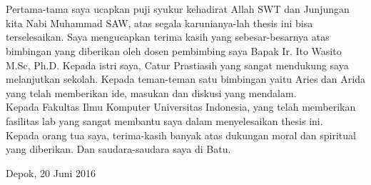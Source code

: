 \chapter*{\kataPengantar}
Pertama-tama saya ucapkan puji syukur kehadirat Allah SWT dan Junjungan kita Nabi Muhammad SAW, atas segala karunianya-lah thesis ini bisa terselesaikan. Saya mengucapkan terima kasih yang sebesar-besarnya atas bimbingan yang diberikan oleh dosen pembimbing saya Bapak Ir. Ito Wasito M.Sc, Ph.D. Kepada istri saya, Catur Prastiasih yang sangat mendukung  saya melanjutkan sekolah. Kepada teman-teman satu bimbingan yaitu Aries dan Arida yang telah memberikan ide, masukan dan diskusi yang mendalam. \\
Kepada Fakultas Ilmu Komputer Universitas Indonesia, yang telah memberikan fasilitas lab yang sangat membantu saya dalam menyelesaikan thesis ini. \\
Kepada orang tua saya, terima-kasih banyak atas dukungan moral dan spiritual yang diberikan. Dan saudara-saudara saya di Batu.

\vspace*{0.1cm}
\begin{flushright}
Depok, 20 Juni 2016\\[0.1cm]
\vspace*{1cm}
\penulis

\end{flushright}